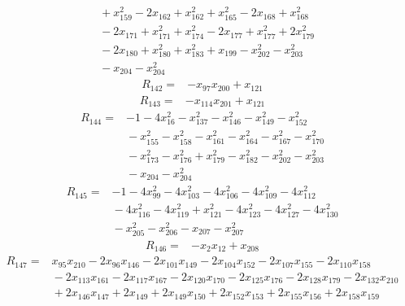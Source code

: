 {\begin{align*}
&{}  + x_{159}^{2} - 2x_{162} + x_{162}^{2} + x_{165}^{2} - 2x_{168} + x_{168}^{2} \\
&{}  - 2x_{171} + x_{171}^{2} + x_{174}^{2} - 2x_{177} + x_{177}^{2} + 2x_{179}^{2} \\
&{}  - 2x_{180} + x_{180}^{2} + x_{183}^{2} + x_{199} - x_{202}^{2} - x_{203}^{2} \\
&{}  - x_{204} - x_{204}^{2}
\end{align*}
\begin{align*}
R_{142} ={}& -x_{97} x_{200} + x_{121}
\end{align*}
\begin{align*}
R_{143} ={}& -x_{114} x_{201} + x_{121}
\end{align*}
\begin{align*}
R_{144} ={}& -1 - 4x_{16}^{2} - x_{137}^{2} - x_{146}^{2} - x_{149}^{2} - x_{152}^{2} \\
&{}  - x_{155}^{2} - x_{158}^{2} - x_{161}^{2} - x_{164}^{2} - x_{167}^{2} - x_{170}^{2} \\
&{}  - x_{173}^{2} - x_{176}^{2} + x_{179}^{2} - x_{182}^{2} - x_{202}^{2} - x_{203}^{2} \\
&{}  - x_{204} - x_{204}^{2}
\end{align*}
\begin{align*}
R_{145} ={}& -1 - 4x_{99}^{2} - 4x_{103}^{2} - 4x_{106}^{2} - 4x_{109}^{2} - 4x_{112}^{2} \\
&{}  - 4x_{116}^{2} - 4x_{119}^{2} + x_{121}^{2} - 4x_{123}^{2} - 4x_{127}^{2} - 4x_{130}^{2} \\
&{}  - x_{205}^{2} - x_{206}^{2} - x_{207} - x_{207}^{2}
\end{align*}
\begin{align*}
R_{146} ={}& -x_{2} x_{12} + x_{208}
\end{align*}
\begin{align*}
R_{147} ={}& x_{95} x_{210} - 2x_{96} x_{146} - 2x_{101} x_{149} - 2x_{104} x_{152} - 2x_{107} x_{155} - 2x_{110} x_{158} \\
&{}  - 2x_{113} x_{161} - 2x_{117} x_{167} - 2x_{120} x_{170} - 2x_{125} x_{176} - 2x_{128} x_{179} - 2x_{132} x_{210} \\
&{}  + 2x_{146} x_{147} + 2x_{149} + 2x_{149} x_{150} + 2x_{152} x_{153} + 2x_{155} x_{156} + 2x_{158} x_{159} \\

\end{align*}}
